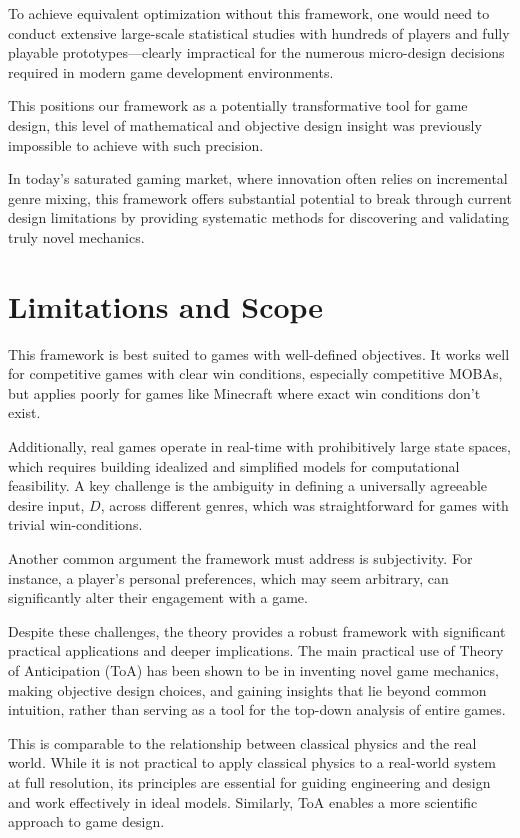 \documentclass{article}
\begin{document}
To achieve equivalent optimization without this framework, one would need to conduct extensive large-scale statistical studies with hundreds of players and fully playable prototypes---clearly impractical for the numerous micro-design decisions required in modern game development environments.

This positions our framework as a potentially transformative tool for game design, this level of mathematical and objective design insight was previously impossible to achieve with such precision.

In today's saturated gaming market, where innovation often relies on incremental genre mixing, this framework offers substantial potential to break through current design limitations by providing systematic methods for discovering and validating truly novel mechanics.

\section{Limitations and Scope}

This framework is best suited to games with well-defined objectives. It works well for competitive games with clear win conditions, especially competitive MOBAs, but applies poorly for games like Minecraft where exact win conditions don't exist.

Additionally, real games operate in real-time with prohibitively large state spaces, which requires building idealized and simplified models for computational feasibility. A key challenge is the ambiguity in defining a universally agreeable desire input, $D$, across different genres, which was straightforward for games with trivial win-conditions.

Another common argument the framework must address is subjectivity. For instance, a player's personal preferences, which may seem arbitrary, can significantly alter their engagement with a game.

Despite these challenges, the theory provides a robust framework with significant practical applications and deeper implications. The main practical use of Theory of Anticipation (ToA) has been shown to be in inventing novel game mechanics, making objective design choices, and gaining insights that lie beyond common intuition, rather than serving as a tool for the top-down analysis of entire games.

This is comparable to the relationship between classical physics and the real world. While it is not practical to apply classical physics to a real-world system at full resolution, its principles are essential for guiding engineering and design and work effectively in ideal models. Similarly, ToA enables a more scientific approach to game design.
\end{document}
